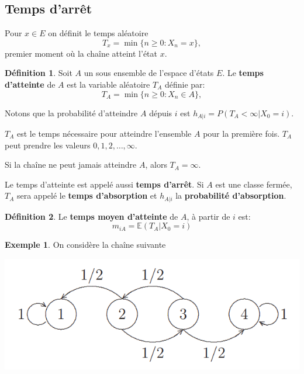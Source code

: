 \documentclass[
]{book}
\theoremstyle{definition}
\newtheorem{definition}{Définition}[chapter]
\theoremstyle{definition}
\newtheorem{example}{Exemple}[chapter]
\theoremstyle{definition}
\theoremstyle{remark}
\begin{document}
\hypertarget{temps-darruxeat}{%
\subsection{Temps d'arrêt}\label{temps-darruxeat}}

Pour \(x \in E\) on définit le temps aléatoire
\[
T_x = \min\{n \geq 0 : X_n = x\},
\]
premier moment où la chaîne atteint l'état \(x\).

\begin{definition}
\protect\hypertarget{def:unnamed-chunk-34}{}{\label{def:unnamed-chunk-34} }Soit \(A\) un sous ensemble de l'espace d'états \(E\). Le \textbf{temps d'atteinte} de \(A\) est la variable aléatoire \(T_A\) définie par:
\[
T_A = \min\{n \geq 0 : X_n \in A \},
\]
\end{definition}

Notons que la probabilité d'atteindre \(A\) dépuis \(i\) est \(h_{A|i} = P(T_A < \infty |X_0 = i)\).

\(T_A\) est le temps nécessaire pour atteindre l'ensemble \(A\) pour la première fois. \(T_A\) peut prendre les valeurs \(0,1,2,\ldots , \infty\).

Si la chaîne ne peut jamais atteindre \(A\), alors \(T_A= \infty\).

Le temps d'atteinte est appelé aussi \textbf{temps d'arrêt}. Si \(A\) est une classe fermée, \(T_A\) sera appelé le \textbf{temps d'absorption} et \(h_{A|i}\) la \textbf{probabilité d'absorption}.

\begin{definition}
\protect\hypertarget{def:unnamed-chunk-35}{}{\label{def:unnamed-chunk-35} }Le \textbf{temps moyen d'atteinte} de \(A\), à partir de \(i\) est:
\[ m_{iA}=\mathbb{E}\left(T_A | X_0=i \right)\]
\end{definition}

\begin{example}
\protect\hypertarget{exm:unnamed-chunk-36}{}{\label{exm:unnamed-chunk-36} }On considère la chaîne suivante
\end{example}

\begin{center}\includegraphics[width=0.45\linewidth]{images/graphe3} \end{center}
\end{document}
